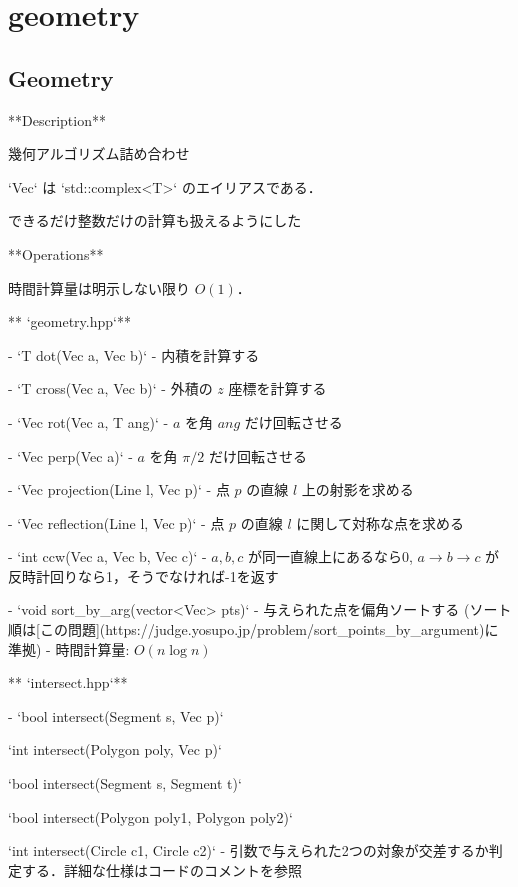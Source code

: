 \section{geometry}

\subsection{Geometry}

\begin{small}
\begin{markdown}
**Description**

幾何アルゴリズム詰め合わせ

`Vec` は `std::complex<T>` のエイリアスである．

できるだけ整数だけの計算も扱えるようにした

**Operations**

時間計算量は明示しない限り $O(1)$．

** `geometry.hpp`**

- `T dot(Vec a, Vec b)`
    - 内積を計算する

- `T cross(Vec a, Vec b)`
    - 外積の $z$ 座標を計算する

- `Vec rot(Vec a, T ang)`
    - $a$ を角 $ang$ だけ回転させる

- `Vec perp(Vec a)`
    - $a$ を角 $\pi/2$ だけ回転させる

- `Vec projection(Line l, Vec p)`
    - 点 $p$ の直線 $l$ 上の射影を求める

- `Vec reflection(Line l, Vec p)`
    - 点 $p$ の直線 $l$ に関して対称な点を求める

- `int ccw(Vec a, Vec b, Vec c)`
    - $a,b,c$ が同一直線上にあるなら0, $a \rightarrow b \rightarrow c$ が反時計回りなら1，そうでなければ-1を返す

- `void sort\_by\_arg(vector<Vec> pts)`
  - 与えられた点を偏角ソートする (ソート順は[この問題](https://judge.yosupo.jp/problem/sort\_points\_by\_argument)に準拠)
  - 時間計算量: $O(n\log n)$

** `intersect.hpp`**

- `bool intersect(Segment s, Vec p)`

  `int intersect(Polygon poly, Vec p)`

  `bool intersect(Segment s, Segment t)`

  `bool intersect(Polygon poly1, Polygon poly2)`

  `int intersect(Circle c1, Circle c2)`
    - 引数で与えられた2つの対象が交差するか判定する．詳細な仕様はコードのコメントを参照


\end{markdown}
\end{small}
